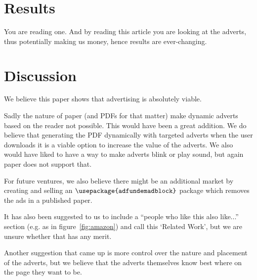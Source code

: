 \documentclass[letterpaper, twocolumn]{article}
\begin{document}
	\section{Results}\label{sec:results}
	You are reading one. And by reading this article you are looking at the adverts, thus potentially making us money, hence results are ever-changing.
	
	\section{Discussion}\label{sec:discussion}
	We believe this paper shows that advertising is absolutely viable. 
	
	Sadly the nature of paper (and PDFs for that matter) make dynamic adverts based on the reader not possible. This would have been a great addition. We do believe that generating the PDF dynamically with targeted adverts when the user downloads it is a viable option to increase the value of the adverts. We also would have liked to have a way to make adverts blink or play sound, but again paper does not support that.
	
	For future ventures, we also believe there might be an additional market by creating and selling an $\verb|\usepackage{adfundemadblock}|$ package which removes the ads in a published paper. 
	
	It has also been suggested to us to include a ``people who like this also like...'' section (e.g. as in figure~\ref{fig:amazon}) and call this `Related Work', but we are unsure whether that has any merit.
	
	Another suggestion that came up is more control over the nature and placement of the adverts, but we believe that the adverts themselves know best where on the page they want to be.
	
\end{document}
